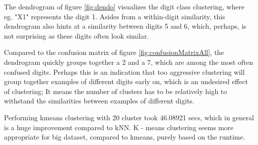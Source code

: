 \documentclass[10pt,a4paper]{article}
\begin{document}
\begin{figure}[H]
  		 \hspace{1em}
	\end{figure}


The dendrogram of figure \ref{fig:dendo} visualizes
the digit class clustering, where eg. "X1" represents the digit 1.
Asides from a within-digit similarity, this dendrogram also
hints at a similarity between digits 5 and 6, which,
perhaps, is not surprising as these digits often look similar.

Compared to the confusion matrix of figure \ref{fig:confusionMatrixAll},
the dendrogram quickly groups together a 2 and a 7,
which are among the most often confused digits.
Perhaps this is an indication that too aggressive clustering
will group together examples of different digits
early on, which is an undesired effect of clustering;
It means the number of clusters has to be relatively high
to withstand the similarities between examples of different digits.

Performing kmeans clustering with 20 cluster took 46.08921 secs, which in general is a huge improvement compared to kNN.   K - means clustering seems more appropriate for big dataset,  compared to kmeans, purely based on the runtime. 
\end{document}
